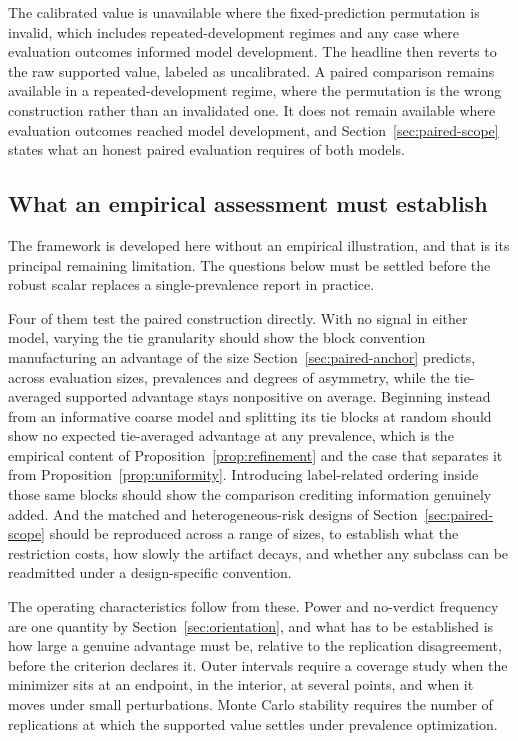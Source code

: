 \documentclass[11pt]{article}
\theoremstyle{remark}
\begin{document}
The calibrated value is unavailable where the fixed-prediction permutation is invalid, which includes repeated-development regimes and any case where evaluation outcomes informed model development. The headline then reverts to the raw supported value, labeled as uncalibrated. A paired comparison remains available in a repeated-development regime, where the permutation is the wrong construction rather than an invalidated one. It does not remain available where evaluation outcomes reached model development, and Section~\ref{sec:paired-scope} states what an honest paired evaluation requires of both models.


\subsection{What an empirical assessment must establish}

The framework is developed here without an empirical illustration, and that is its principal remaining limitation. The questions below must be settled before the robust scalar replaces a single-prevalence report in practice.

Four of them test the paired construction directly. With no signal in either model, varying the tie granularity should show the block convention manufacturing an advantage of the size Section~\ref{sec:paired-anchor} predicts, across evaluation sizes, prevalences and degrees of asymmetry, while the tie-averaged supported advantage stays nonpositive on average. Beginning instead from an informative coarse model and splitting its tie blocks at random should show no expected tie-averaged advantage at any prevalence, which is the empirical content of Proposition~\ref{prop:refinement} and the case that separates it from Proposition~\ref{prop:uniformity}. Introducing label-related ordering inside those same blocks should show the comparison crediting information genuinely added. And the matched and heterogeneous-risk designs of Section~\ref{sec:paired-scope} should be reproduced across a range of sizes, to establish what the restriction costs, how slowly the artifact decays, and whether any subclass can be readmitted under a design-specific convention.

The operating characteristics follow from these. Power and no-verdict frequency are one quantity by Section~\ref{sec:orientation}, and what has to be established is how large a genuine advantage must be, relative to the replication disagreement, before the criterion declares it. Outer intervals require a coverage study when the minimizer sits at an endpoint, in the interior, at several points, and when it moves under small perturbations. Monte Carlo stability requires the number of replications at which the supported value settles under prevalence optimization.
\end{document}
